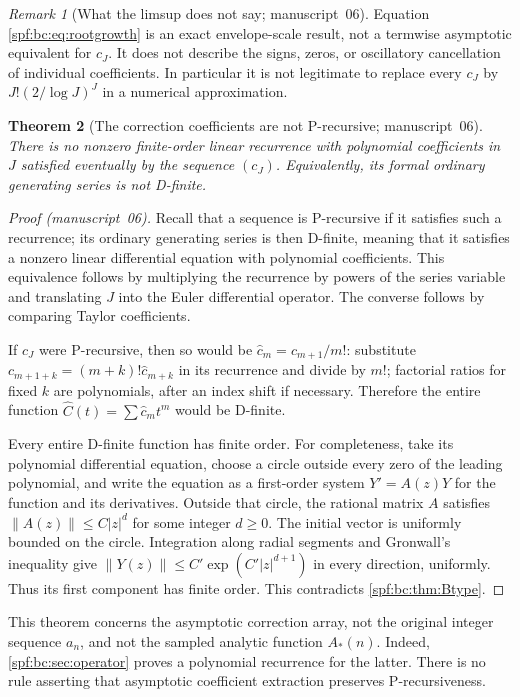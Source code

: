 \documentclass[11pt]{article}
\numberwithin{equation}{section}
\newtheorem{theorem}{Theorem}[section]
\theoremstyle{definition}
\theoremstyle{remark}
\newtheorem{remark}[theorem]{Remark}
\theoremstyle{definition}
\newcommand{\bcA}{A_{\!*}}
\begin{document}
\begin{remark}[What the limsup does not say; manuscript~06]
Equation \eqref{spf:bc:eq:rootgrowth} is an exact envelope-scale result, not a
termwise asymptotic equivalent for $c_J$. It does not describe the signs,
zeros, or oscillatory cancellation of individual coefficients. In particular
it is not legitimate to replace every $c_J$ by
$J!(2/\log J)^J$ in a numerical approximation.
\end{remark}

\begin{theorem}[The correction coefficients are not P-recursive; manuscript~06]
\label{spf:bc:thm:nonholonomic}
There is no nonzero finite-order linear recurrence with polynomial
coefficients in $J$ satisfied eventually by the sequence $(c_J)$. Equivalently,
its formal ordinary generating series is not D-finite.
\end{theorem}
\begin{proof}[Proof (manuscript~06)]
Recall that a sequence is P-recursive if it satisfies such a recurrence;
its ordinary generating series is then D-finite, meaning that it satisfies
a nonzero linear differential equation with polynomial coefficients.
This equivalence follows by multiplying the recurrence by powers of the
series variable and translating $J$ into the Euler differential operator.
The converse follows by comparing Taylor coefficients.

If $c_J$ were P-recursive, then so would be $\hat c_m=c_{m+1}/m!$: substitute
$c_{m+1+k}=(m+k)!\hat c_{m+k}$ in its recurrence and divide by $m!$; factorial
ratios for fixed $k$ are polynomials, after an index shift if necessary.
Therefore the entire function $\widehat C(t)=\sum \hat c_mt^m$ would be D-finite.

Every entire D-finite function has finite order. For completeness, take its
polynomial differential equation, choose a circle outside every zero of the
leading polynomial, and write the equation as a first-order system
$Y'=A(z)Y$ for the function and its derivatives. Outside that circle, the
rational matrix $A$ satisfies $\|A(z)\|\le C|z|^d$ for some integer $d\ge0$.
The initial vector is uniformly bounded on the circle. Integration along
radial segments and Gronwall's inequality give
$\|Y(z)\|\le C'\exp(C'|z|^{d+1})$ in every direction, uniformly. Thus its
first component has finite order. This contradicts \cref{spf:bc:thm:Btype}.
\end{proof}

This theorem concerns the asymptotic correction array, not the original
integer sequence $a_n$, and not the sampled analytic function $\bcA(n)$.
Indeed, \cref{spf:bc:sec:operator} proves a polynomial recurrence for the latter.
There is no rule asserting that asymptotic coefficient extraction preserves
P-recursiveness.
\end{document}

